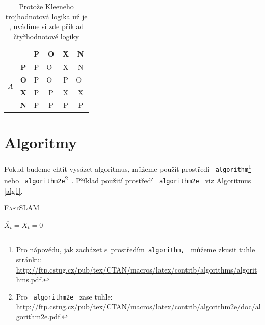 \documentclass[11pt, a4paper]{article}
\begin{document}
\begin{table}[h]
\begin{tabular}{|cc|c|c|c|c|}
             & & \textbf{P} & \textbf{O} & \textbf{X} & \textbf{N} \\ \hline
             \multicolumn{1}{|c|}{\multirow{4}{*}{$A$}} & \textbf{P} & P & O~& X & N \\ \cline{2-6}
             \multicolumn{1}{|c|}{} & \textbf{O} & P & O~& P & O~\\ \cline{2-6}
             \multicolumn{1}{|c|}{} & \textbf{X} & P & P & X & X \\ \cline{2-6}
             \multicolumn{1}{|c|}{} & \textbf{N} & P & P & P & P \\ \cline{2-6} \hline
        \end{tabular} \caption{Protože Kleeneho trojhodnotová logika už je , 
        uvádíme si zde příklad čtyřhodnotové logiky} \label{tab2}
\end{table}
\bigskip
\pagebreak

\section{Algoritmy}\label{sekce3}

Pokud budeme chtít vysázet algoritmus, můžeme použít prostředí 
\, \verb|algorithm|\footnote{Pro nápovědu, jak zacházet s~prostředím\, \texttt{algorithm,} \, můžeme zkusit tuhle stránku: \\\url{http://ftp.cstug.cz/pub/tex/CTAN/macros/latex/contrib/algorithms/algorithms.pdf}.} \, 
nebo \, \verb|algorithm2e|\footnote{Pro \, \texttt{algorithm2e} \, zase tuhle: \url{http://ftp.cstug.cz/pub/tex/CTAN/macros/latex/contrib/algorithm2e/doc/algorithm2e.pdf}.} \,. Příklad použití prostředí \, \verb|algorithm2e| \, viz Algoritmus \ref{alg1}.

\begin{algorithm}[h]\label{alg1}
    \SetAlgoNoLine
    \DontPrintSemicolon

    \SetNlSty{}{}{:}
    \SetNlSkip{-1.2em}

    \caption{\textsc{FastSLAM}}


    \Indp \Indpp
    \BlankLine
    $\overline{X_t} = X_t = 0$\;
\end{algorithm}
\end{document}
